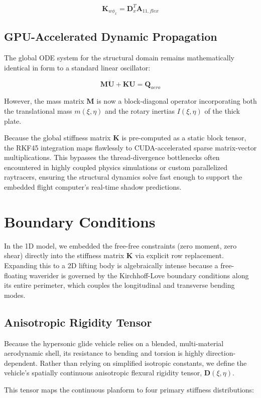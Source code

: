 \documentclass[11pt,a4paper]{article}
\theoremstyle{definition}
\numberwithin{equation}{section}
\begin{document}
$$\mathbf{K}_{w\phi_x} = \mathbf{D}_x^T \mathbf{A}_{11, flex}$$

\subsection{GPU-Accelerated Dynamic Propagation}
The global ODE system for the structural domain remains mathematically identical in form to a standard linear oscillator:

$$\mathbf{M} \mathbf{\ddot{U}} + \mathbf{K} \mathbf{U} = \mathbf{Q}_{aero}$$

However, the mass matrix $\mathbf{M}$ is now a block-diagonal operator incorporating both the translational mass $m(\xi, \eta)$ and the rotary inertias $I(\xi, \eta)$ of the thick plate.

Because the global stiffness matrix $\mathbf{K}$ is pre-computed as a static block tensor, the RKF45 integration maps flawlessly to CUDA-accelerated sparse matrix-vector multiplications. This bypasses the thread-divergence bottlenecks often encountered in highly coupled physics simulations or custom parallelized raytracers, ensuring the structural dynamics solve fast enough to support the embedded flight computer's real-time shadow predictions.

\section{Boundary Conditions}
In the 1D model, we embedded the free-free constraints (zero moment, zero shear) directly into the stiffness matrix $\mathbf{K}$ via explicit row replacement. Expanding this to a 2D lifting body is algebraically intense because a free-floating waverider is governed by the Kirchhoff-Love boundary conditions along its entire perimeter, which couples the longitudinal and transverse bending modes.

\subsection{Anisotropic Rigidity Tensor}

Because the hypersonic glide vehicle relies on a blended, multi-material aerodynamic shell, its resistance to bending and torsion is highly direction-dependent. Rather than relying on simplified isotropic constants, we define the vehicle's spatially continuous anisotropic flexural rigidity tensor, $\mathbf{D}(\xi, \eta)$.

This tensor maps the continuous planform to four primary stiffness distributions:
\end{document}
